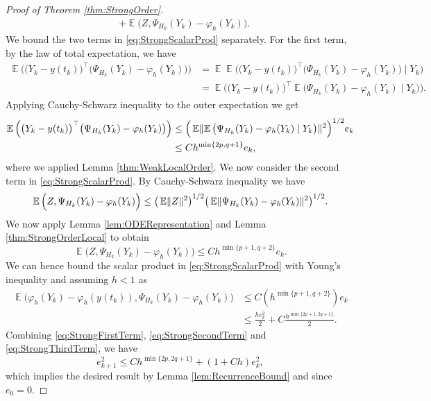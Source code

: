 \documentclass{siamart1116}
\numberwithin{theorem}{section}
\DeclarePairedDelimiter{\norm}{\|}{\|}
\renewcommand{\phi}{\varphi}
\newcommand{\E}{\operatorname{\mathbb{E}}}
\begin{document}
\begin{proof}[Proof of Theorem \ref{thm:StrongOrder}]
\begin{equation}
\begin{aligned}
		&+ \E\Big(Z, \Psi_{H_k}(Y_k) - \phi_{h}(Y_k)\Big).
	\end{aligned}
	\end{equation}
	We bound the two terms in \eqref{eq:StrongScalarProd} separately. For the first term, by the law of total expectation, we have
	\begin{equation}
	\begin{aligned}
		\E\Big(\big(Y_k - y(t_k)\big)^\top \big(\Psi_{H_k}(Y_k) - \phi_{h}(Y_k)\big)\Big) &= \E\E\Big(\big(Y_k - y(t_k)\big)^\top \big(\Psi_{H_k}(Y_k) - \phi_{h}(Y_k)\big) \mid Y_k\Big)\\
		&= \E\Big(\big(Y_k - y(t_k)\big)^\top\E \big(\Psi_{H_k}(Y_k) - \phi_{h}(Y_k) \mid Y_k \big)\Big).
	\end{aligned}
	\end{equation}
	Applying Cauchy-Schwarz inequality to the outer expectation we get
	\begin{equation}
	\begin{aligned}
		\E\Big(\big(Y_k - y(t_k)\big)^\top \big(\Psi_{H_k}(Y_k) - \phi_{h}(Y_k)\big)\Big) &\leq \Big(\E\norm{\E\big(\Psi_{H_k}(Y_k) - \phi_{h}(Y_k) \mid Y_k\big)}^{2}\Big)^{1/2}e_k  \\
		&\leq  Ch^{\min\{2p, q+1\}}e_k,
	\end{aligned}
	\end{equation}
	where we applied Lemma \ref{thm:WeakLocalOrder}. We now consider the second term in \eqref{eq:StrongScalarProd}. By Cauchy-Schwarz inequality we have
	\begin{equation}
		\E\Big(Z, \Psi_{H_k}(Y_k) - \phi_{h}(Y_k)\Big) \leq \big(\E\norm{Z}^{2}\big)^{1/2} \big(\E\norm{\Psi_{H_k}(Y_k) - \phi_{h}(Y_k)}^2\big)^{1/2}.
	\end{equation}
	We now apply Lemma \ref{lem:ODERepresentation} and Lemma \ref{thm:StrongOrderLocal} to obtain
	\begin{equation}
		\E\Big(Z, \Psi_{H_k}(Y_k) - \phi_{h}(Y_k)\Big) \leq C h^{\min\{p+1, q+2\}} e_k.
	\end{equation}
	We can hence bound the scalar product in \eqref{eq:StrongScalarProd} with Young's inequality and assuming $h < 1$ as
	\begin{equation}\label{eq:StrongThirdTerm}
	\begin{aligned}
		\E\Big(\phi_{h}(Y_k) - \phi_{h}(y(t_k)), \Psi_{H_k}(Y_k) - \phi_{h}(Y_k)\Big) &\leq C(h^{\min\{p+1, q+2\}})e_k \\
		&\leq \frac{he_k^2}{2} + C\frac{h^{\min\{2p+1,2q+1\}}}{2}.
	\end{aligned}
	\end{equation}
	Combining \eqref{eq:StrongFirstTerm}, \eqref{eq:StrongSecondTerm} and \eqref{eq:StrongThirdTerm}, we have
	\begin{equation}
		e_{k+1}^2 \leq Ch^{\min\{2p,2q + 1\}} + (1 + Ch)e_k^2,
	\end{equation}
	which implies the desired result by Lemma \ref{lem:RecurrenceBound} and since $e_0 = 0$.
\end{proof}
\end{document}
